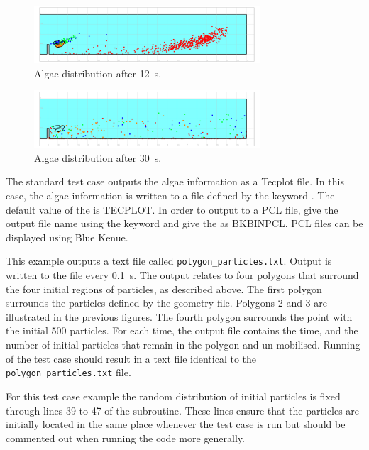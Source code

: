 \begin{figure}[h]
  \begin{center}
    \includegraphics[width=0.75\textwidth]{./img/canal_algae_12s_02}
  \end{center}
  \caption{Algae distribution after 12~s.}
  \label{fig:res_12s}
\end{figure}

\begin{figure}[h]
  \begin{center}
    \includegraphics[width=0.75\textwidth]{./img/canal_algae_30s_02}
  \end{center}
  \caption{Algae distribution after 30~s.}
  \label{fig:res_30s}
\end{figure}

The standard test case outputs the algae information as a Tecplot file.
In this case, the algae information is written to a file defined by the keyword
.
The default value of the  is TECPLOT.
In order to output to a PCL file, give the output file name using the keyword
 and give the  as BKBINPCL.
PCL files can be displayed using Blue Kenue.

\smallskip
This example outputs a text file called \verb!polygon_particles.txt!.
Output is written to the file every 0.1~s.
The output relates to four polygons that surround the four initial regions of
particles, as described above.
The first polygon surrounds the particles defined by the geometry file.
Polygons 2 and 3 are illustrated in the previous figures.
The fourth polygon surrounds the point with the initial 500 particles.
For each time, the output file contains the time, and the number of initial
particles that remain in the polygon and un-mobilised.    
Running of the test case should result in a text file identical to the
\verb!polygon_particles.txt! file.

\smallskip
For this test case example the random distribution of initial particles is fixed
through lines 39 to 47 of the  subroutine.
These lines ensure that the particles are initially located in the same place
whenever the test case is run but should be commented out when running the code
more generally.  
